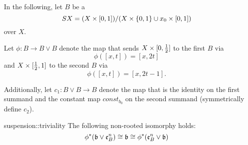 \begin{myparagraph}
    In the following, let $B$ be a 
    \[ SX = (X \times{} [0, 1]) / (X \times \{0, 1\} \cup x_0 \times{} [0, 1])\]
    over $X$.

    Let $\phi: B \to B \vee B$ denote the map that sends
    $X \times [0, \frac{1}{2}]$ to the first $B$ via
    \[ \phi([x, t]) = [x, 2t] \]
    and $X \times [\frac{1}{2}, 1]$ to the second $B$ via
    \[ \phi([x, t]) = [x, 2t - 1]. \]

    Additionally, let $c_1: B \vee B \to B$ denote the map
    that is the identity on the first summand
    and the constant map $const_{b_0}$ on the second summand (symmetrically define $c_2$).
\end{myparagraph}

\begin{mylemma}{suspension::triviality}{}
    The following non-rooted isomorphy holds:
    \[ \phi^*(\mathfrak{b} \vee \mathfrak{e}^{n}_{B}) \cong \mathfrak{b} \cong \phi^*(\mathfrak{e}^{n}_{B} \vee \mathfrak{b}) \]
\end{mylemma}
